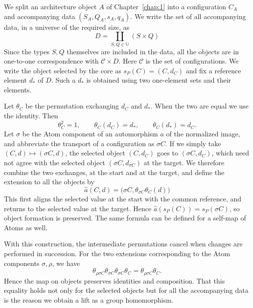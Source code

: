 \begin{construction}\label{cons:7.17}

We split an architecture object $A$ of Chapter~\ref{chap:1} into a configuration $C_A$ and
accompanying data $(S_A,Q_A,s_A,q_A)$. We write the set of all accompanying data, in a
universe of the required size, as
\begin{equation*}
D=\coprod_{S,Q\in\mathbb{U}}(S\times Q)
\tag{7.23}\label{eq:7.23}
\end{equation*}
Since the types $S,Q$ themselves are included in the data, all the objects are in one-to-one
correspondence with $\mathcal C\times D$.
Here $\mathcal C$ is the set of configurations.
We write the object selected by the core as $s_P(C)=(C,d_C)$ and fix a reference element
$d_*$ of $D$.
Such a $d_*$ is obtained using two one-element sets and their elements.

Let $\theta_C$ be the permutation exchanging $d_C$ and $d_*$.
When the two are equal we use the identity. Then
\begin{equation*}
\theta_C^2=1,\qquad \theta_C(d_C)=d_*,\qquad
\theta_C(d_*)=d_C.
\tag{7.24}\label{eq:7.24}
\end{equation*}
Let $\sigma$ be the Atom component of an automorphism $a$ of the normalized image, and
abbreviate the transport of a configuration as $\sigma C$.
If we simply take $(C,d)\mapsto(\sigma C,d)$, the selected object $(C,d_C)$ goes to
$(\sigma C,d_C)$, which need not agree with the selected object $(\sigma C,d_{\sigma C})$ at
the target.
We therefore combine the two exchanges, at the start and at the target, and define the
extension to all the objects by
\begin{equation*}
\widehat a(C,d)=
\bigl(\sigma C,\theta_{\sigma C}\theta_C(d)\bigr)
\tag{7.25}\label{eq:7.25}
\end{equation*}
This first aligns the selected value at the start with the common reference, and returns to
the selected value at the target.
Hence $\widehat a(s_P(C))=s_P(\sigma C)$, so object formation is preserved.
The same formula can be defined for a self-map of Atoms as well.

With this construction, the intermediate permutations cancel when changes are performed in
succession.
For the two extensions corresponding to the Atom components $\sigma,\rho$, we have
\begin{equation*}
\theta_{\rho\sigma C}\theta_{\sigma C}
\theta_{\sigma C}\theta_C
=\theta_{\rho\sigma C}\theta_C.
\tag{7.26}\label{eq:7.26}
\end{equation*}
Hence the map on objects preserves identities and composition.
That this equality holds not only for the selected objects but for all the accompanying data
is the reason we obtain a lift as a group homomorphism.

\end{construction}

